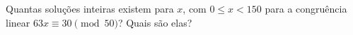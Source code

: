 Quantas soluções inteiras existem para $x$, com $0 \leq x < 150$ para a congruência linear $63x \equiv 30 \pmod{50}$? Quais são elas?
